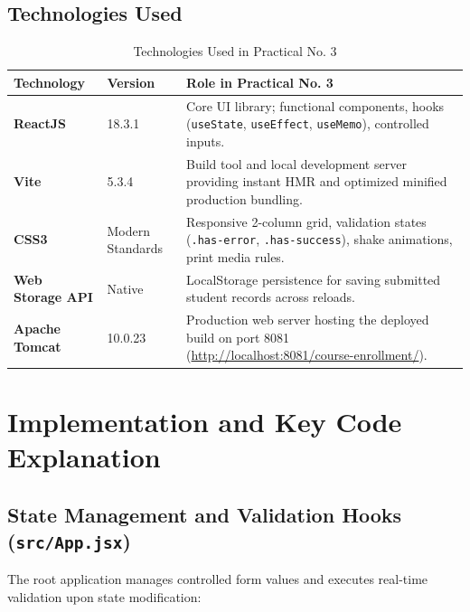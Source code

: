 \documentclass[11pt,a4paper]{article}
\begin{document}
\subsection{Technologies Used}
\begin{table}[htbp]
\centering
\small
\renewcommand{\arraystretch}{1.3}
\begin{tabularx}{\textwidth}{l p{3.2cm} X}
\toprule
\textbf{Technology} & \textbf{Version} & \textbf{Role in Practical No. 3} \\
\midrule
\textbf{ReactJS} & 18.3.1 & Core UI library; functional components, hooks (\texttt{useState}, \texttt{useEffect}, \texttt{useMemo}), controlled inputs. \\
\textbf{Vite} & 5.3.4 & Build tool and local development server providing instant HMR and optimized minified production bundling. \\
\textbf{CSS3} & Modern Standards & Responsive 2-column grid, validation states (\texttt{.has-error}, \texttt{.has-success}), shake animations, print media rules. \\
\textbf{Web Storage API} & Native & LocalStorage persistence for saving submitted student records across reloads. \\
\textbf{Apache Tomcat} & 10.0.23 & Production web server hosting the deployed build on port 8081 (\url{http://localhost:8081/course-enrollment/}). \\
\bottomrule
\end{tabularx}
\caption{Technologies Used in Practical No. 3}
\end{table}

\newpage

\section{Implementation and Key Code Explanation}

\subsection{State Management and Validation Hooks (\texttt{src/App.jsx})}
The root application manages controlled form values and executes real-time validation upon state modification:
\end{document}
